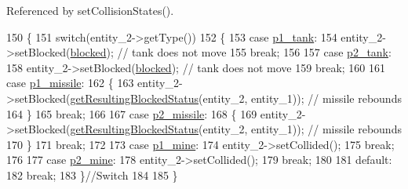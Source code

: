 Referenced by set\-Collision\-States().


\begin{DoxyCode}
150 \{
151     \textcolor{keywordflow}{switch}(entity\_2->getType())
152     \{
153     \textcolor{keywordflow}{case} \hyperlink{Structures_8h_a6d8f83e710b27d4f86c45f0bb77066e3a31fa78b2b7dd774f5158a16ef230932e}{p1\_tank}:
154         entity\_2->setBlocked(\hyperlink{Structures_8h_a6fef29d9424addfa69bdd2a379424896a9ee4e6c1dfe13f0d0f0cb7b29c62b2eb}{blocked}); \textcolor{comment}{// tank does not move}
155         \textcolor{keywordflow}{break};
156 
157     \textcolor{keywordflow}{case} \hyperlink{Structures_8h_a6d8f83e710b27d4f86c45f0bb77066e3a3d48d62c7b88e7ee171698fe56dc9e59}{p2\_tank}:
158         entity\_2->setBlocked(\hyperlink{Structures_8h_a6fef29d9424addfa69bdd2a379424896a9ee4e6c1dfe13f0d0f0cb7b29c62b2eb}{blocked}); \textcolor{comment}{// tank does not move}
159         \textcolor{keywordflow}{break};
160 
161     \textcolor{keywordflow}{case} \hyperlink{Structures_8h_a6d8f83e710b27d4f86c45f0bb77066e3af89bc631e9b0140ed004b5ce2db5330c}{p1\_missile}:
162         \{
163             entity\_2->setBlocked(\hyperlink{classCollisionManager_a9863f3588677449e9b5edd42aa5bbabd}{getResultingBlockedStatus}(entity\_2, entity\_1)); \textcolor{comment}{
      // missile rebounds}
164         \}
165         \textcolor{keywordflow}{break};
166 
167     \textcolor{keywordflow}{case} \hyperlink{Structures_8h_a6d8f83e710b27d4f86c45f0bb77066e3a47100170e5852d632dfe65582a18256d}{p2\_missile}:
168         \{
169             entity\_2->setBlocked(\hyperlink{classCollisionManager_a9863f3588677449e9b5edd42aa5bbabd}{getResultingBlockedStatus}(entity\_2, entity\_1)); \textcolor{comment}{
      // missile rebounds}
170         \}
171         \textcolor{keywordflow}{break};
172 
173     \textcolor{keywordflow}{case} \hyperlink{Structures_8h_a6d8f83e710b27d4f86c45f0bb77066e3afc52e626787e982ae5d0a747bed6666d}{p1\_mine}:
174         entity\_2->setCollided();
175         \textcolor{keywordflow}{break};
176 
177     \textcolor{keywordflow}{case} \hyperlink{Structures_8h_a6d8f83e710b27d4f86c45f0bb77066e3ada293b37940e64ec2cf6dbd2ae493d2b}{p2\_mine}:
178         entity\_2->setCollided();
179         \textcolor{keywordflow}{break};
180 
181     \textcolor{keywordflow}{default}:
182         \textcolor{keywordflow}{break};
183     \}\textcolor{comment}{//Switch}
184 
185 \}
\end{DoxyCode}
